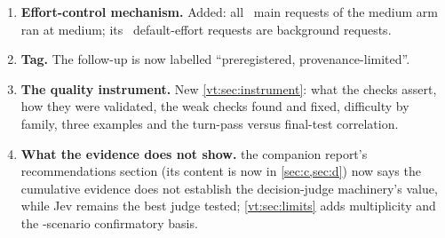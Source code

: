 \begin{enumerate}[leftmargin=1.6em]
    (\RgStaticMedian\ tokens). Priced at each request's own model rates, the residual is \$\RgResidFableAnchor\ per
    Fable anchor session (the reviewer's figure was close) and \$\RgResidFableSticky\ per Fable sticky session (lower
    than the reviewer's, which priced sticky at the host rate). Removing it moves no confirmatory cell by more than
    \RgResidShiftMax, somewhat more than the reviewer's estimate; no verdict changes. The \RgBigN\ very large first
    writes are the sessions that found the shared tool prefix cold.
  \item \textbf{Effort-control mechanism.} Added: all \RgEcMainMedium\ main requests of the medium arm ran at medium;
    its \RgEcNonMainDefault\ default-effort requests are background requests.
  \item \textbf{Tag.} The follow-up is now labelled ``preregistered, provenance-limited''.
  \item \textbf{The quality instrument.} New \cref{vt:sec:instrument}: what the checks assert, how they were validated,
    the weak checks found and fixed, difficulty by family, three examples and the turn-pass versus final-test
    correlation.
  \item \textbf{What the evidence does not show.} the companion report's recommendations section (its content is now in \cref{sec:c,sec:d}) now says the cumulative evidence does not establish
    the decision-judge machinery's value, while Jev remains the best judge tested; \cref{vt:sec:limits} adds
    multiplicity and the \NTest-scenario confirmatory basis.
\end{enumerate}
